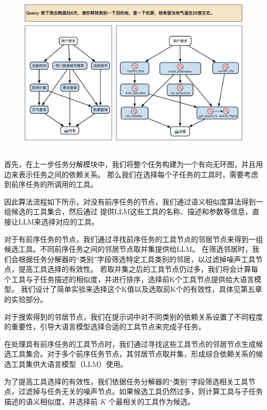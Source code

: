 \begin{figure}[!htp]
  \vspace{1em}
  \centering
  \setlength{\abovecaptionskip}{10pt} %
  \includegraphics[height=8cm]{../assets/ch4-工具选择器.pdf}
  \label{fig:ch4-dfs}
\end{figure}

首先，在上一步任务分解模块中，我们将整个任务构建为一个有向无环图，并且用边来表示任务之间的依赖关系。
那么我们在选择每个子任务的工具时，需要考虑到前序任务的所调用的工具。

因此算法流程如下所示，对没有前序任务的节点，我们通过语义相似度算法得到一组候选的工具集合，然后通过
提供LLM这些工具的名称、描述和参数等信息，直接让LLM来选择对应的工具。

对于有前序任务的节点，我们通过寻找前序任务的工具节点的邻居节点来得到一组候选工具。不同前序任务之间的邻居节点取并集提供给LLM。
在筛选邻居时，我们会根据任务分解器的“类别”字段筛选特定工具类别的邻居，以过滤掉噪声工具节点，提高工具选择的有效性。
若取并集之后的工具节点仍过多，我们将会计算每个工具与子任务描述的相似度，并进行排序，选择前K个工具节点提供给大语言模型。
我们设计了简单实验来选择这个K值以及选取前K个的有效性，具体见第五章的实验部分。

对于搜索得到的邻居节点，我们在提示词中对不同类别的依赖关系设置了不同程度的重要性，引导大语言模型选择合适的工具节点来完成子任务。

在处理具有前序任务的工具节点时，我们通过寻找这些工具节点的邻居节点生成候选工具集合。对于多个前序任务节点，其邻居节点取并集，形成综合依赖关系的候选工具集供大语言模型（LLM）使用。

为了提高工具选择的有效性，我们依据任务分解器的“类别”字段筛选相关工具节点，过滤掉与任务无关的噪声节点。如果候选工具仍然过多，则计算工具与子任务描述的语义相似度，并选择前 $K$ 个最相关的工具作为候选。

